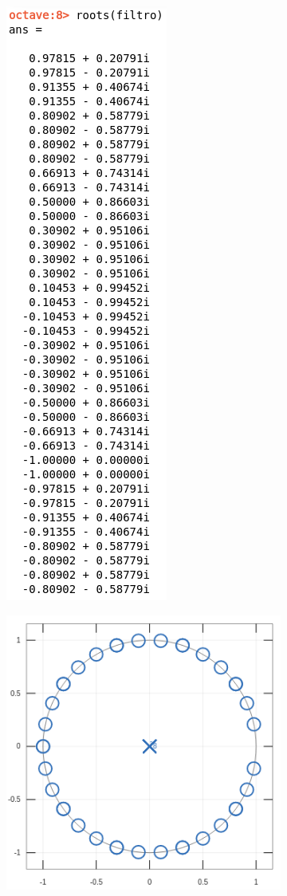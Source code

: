 \documentclass[11pt,a4paper]{article}
\begin{document}
\begin{figure}[H]
\begin{subfigure}{.5\textwidth}
  \centering
  \includegraphics[width=.3\linewidth]{img/polos6.png}
\end{subfigure}%
\begin{subfigure}{.5\textwidth}
  \centering
  \includegraphics[width=1\linewidth]{img/polosg6.png}
\end{subfigure}
\end{figure}
\end{document}

